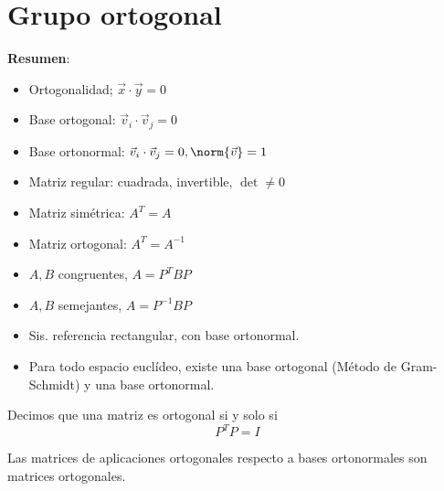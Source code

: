 \documentclass{./Geometria.tex}
\begin{document}
\chapter{Grupo ortogonal}
\textbf{Resumen}:
\begin{itemize}
    \item Ortogonalidad; \(\vec{x} \cdot \vec{y} = 0\)
    \item Base ortogonal: \(\vec{v}_i \cdot \vec{v}_j = 0\)
    \item Base ortonormal: \(\vec{v}_i \cdot \vec{v}_j = 0, \norm{\vec{v}} = 1\)
    \item Matriz regular: cuadrada, invertible, \(\det \neq 0\)
    \item Matriz simétrica: \(A^{T} = A\)
    \item Matriz ortogonal: \(A^{T} = A^{-1}\)
    \item \(A,B\) congruentes, \(A = P^{T}BP\)
    \item \(A,B\) semejantes, \(A = P^{-1}BP\)
    \item Sis. referencia rectangular, con base ortonormal.
    \item Para todo espacio euclídeo, existe una base ortogonal (Método de Gram-Schmidt) y una base ortonormal.
\end{itemize}
\begin{defin}
    Decimos que una matriz es ortogonal si y solo si
    \[
        P^{T}P = I
    \]
\end{defin}
\begin{teorema}
    Las matrices de aplicaciones ortogonales respecto a bases ortonormales son matrices
    ortogonales.
\end{teorema}
\end{document}
